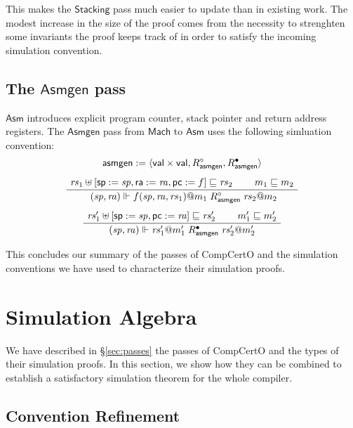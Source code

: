 \documentclass[sigplan,10pt,review,anonymous]{acmart}\settopmatter{printfolios=true,printccs=false,printacmref=false}
\newcommand{\kw}[1]{\ensuremath{ \mathsf{#1} }}
\newcommand{\que}{\circ}
\newcommand{\ans}{\bullet}
\begin{document}
This makes the \kw{Stacking} pass
much easier to update than in existing work.
The modest increase in the size of the proof
comes from the necessity to strenghten
some invariants the proof keeps track of
in order to satisfy the incoming simulation convention.


\subsection{The \kw{Asmgen} pass} %

\kw{Asm} introduces explicit
program counter, stack pointer and return address registers.
The \kw{Asmgen} pass from \kw{Mach} to \kw{Asm}
uses the following simluation convention:
\begin{gather*}
  \kw{asmgen} := \langle \kw{val} \times \kw{val},
    R_\kw{asmgen}^\que, R_\kw{asmgen}^\ans \rangle
  \\[1ex]
  \AxiomC{$\mathit{rs}_1 \uplus
    [\kw{sp} := \mathit{sp}, \kw{ra} := \mathit{ra}, \kw{pc} := f]
    \sqsubseteq \mathit{rs}_2$}
  \AxiomC{$m_1 \sqsubseteq m_2$}
  \BinaryInfC{
    $(\mathit{sp}, \mathit{ra}) \Vdash
     f(\mathit{sp}, \mathit{ra}, \mathit{rs}_1)@m_1
     \mathrel{R_\kw{asmgen}^\que}
     \mathit{rs}_2@m_2$}
  \DisplayProof
  \\[1ex]
  \AxiomC{$
    \mathit{rs}_1' \uplus [\kw{sp} := \mathit{sp}, \kw{pc} := \mathit{ra}]
    \sqsubseteq \mathit{rs}_2'$}
  \AxiomC{$m_1' \sqsubseteq m_2'$}
  \BinaryInfC{$
    (\mathit{sp}, \mathit{ra}) \Vdash \mathit{rs}_1'@m_1'
    \mathrel{R_\kw{asmgen}^\ans}
    \mathit{rs}_2'@m_2'$}
  \DisplayProof
\end{gather*}

This concludes our summary of the passes of CompCertO
and the simulation conventions we have used
to characterize their simulation proofs.



\section{Simulation Algebra} \label{sec:simalg} %

We have described in \S\ref{sec:passes}
the passes of CompCertO
and the types of their simulation proofs.
In this section,
we show how they can be combined to establish
a satisfactory simulation theorem
for the whole compiler.

\subsection{Convention Refinement} %
\end{document}
